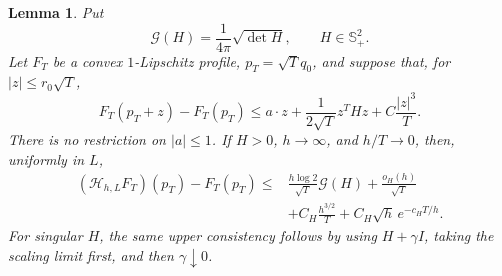 \documentclass{aomart}
\newtheorem{lemma}[theorem]{Lemma}
\theoremstyle{definition}
\newcommand{\1}{\mathbf 1}
\begin{document}
\begin{lemma}\label{lem:localized-upper-consistency}
Put
\begin{equation}
\mathcal G(H)=\frac1{4\pi}\sqrt{\det H},\qquad H\in\mathbb S_ +^2.
\tag{33}
\end{equation}
Let $F_ T$ be a convex $1$-Lipschitz profile, $p_ T=\sqrt Tq_ 0$,
and suppose that, for $|z|\leq r_ 0\sqrt T$,
\begin{equation}
F_ T(p_ T+z)-F_ T(p_ T)
\leq a\cdot z+\frac1{2\sqrt T}z^THz+C\frac{|z|^3}{T}.
\tag{33a}
\end{equation}
There is no restriction on $|a|\leq1$.  If $H>0$, $h\to\infty$,
and $h/T\to0$, then, uniformly in $L$,
\begin{equation}
\begin{split}
(\mathcal H_ {h,L}F_ T)(p_ T)-F_ T(p_ T)
\leq{}&\frac{h\log2}{\sqrt T}\mathcal G(H)+\frac{o_ H(h)}{\sqrt T}\\
&+C_ H\frac{h^{3/2}}T+C_ H\sqrt h\,e^{-c_ HT/h}.                  
\end{split}
\tag{33b}
\end{equation}
For singular $H$, the same upper consistency follows by using
$H+\gamma I$, taking the scaling limit first, and then
$\gamma\downarrow0$.

\end{lemma}
\end{document}
